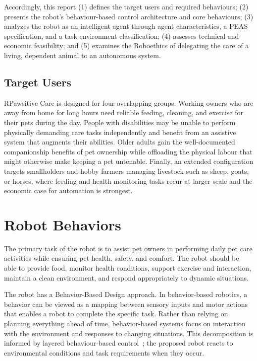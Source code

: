 \documentclass[conference,letterpaper]{IEEEtran}
\begin{document}
Accordingly, this report (1) defines the target users and required behaviours; (2) presents the robot’s behaviour-based control architecture and core behaviours; (3) analyzes the robot as an intelligent agent through agent characteristics, a PEAS specification, and a task-environment classification; (4) assesses technical and economic feasibility; and (5) examines the Roboethics of delegating the care of a living, dependent animal to an autonomous system.

\subsection{Target Users}

RPawsitive Care is designed for four overlapping groups. Working owners who are away from home for long hours need reliable feeding, cleaning, and exercise for their pets during the day. People with disabilities may be unable to perform physically demanding care tasks independently and benefit from an assistive system that augments their abilities. Older adults gain the well-documented companionship benefits of pet ownership while offloading the physical labour that might otherwise make keeping a pet untenable. Finally, an extended configuration targets smallholders and hobby farmers managing livestock such as sheep, goats, or horses, where feeding and health-monitoring tasks recur at larger scale and the economic case for automation is strongest.

\section{Robot Behaviors}

The primary task of the robot is to assist pet owners in performing daily pet care activities while ensuring pet health, safety, and comfort. The robot should be able to provide food, monitor health conditions, support exercise and interaction, maintain a clean environment, and respond appropriately to dynamic situations.

The robot has a Behavior-Based Design approach. In behavior-based robotics, a behavior can be viewed as a mapping between sensory inputs and motor actions that enables a robot to complete the specific task. Rather than relying on planning everything ahead of time, behavior-based systems focus on interaction with the environment and responses to changing situations. This decomposition is informed by layered behaviour-based control~\cite{brooks}; the proposed robot reacts to environmental conditions and task requirements when they occur.
\end{document}
